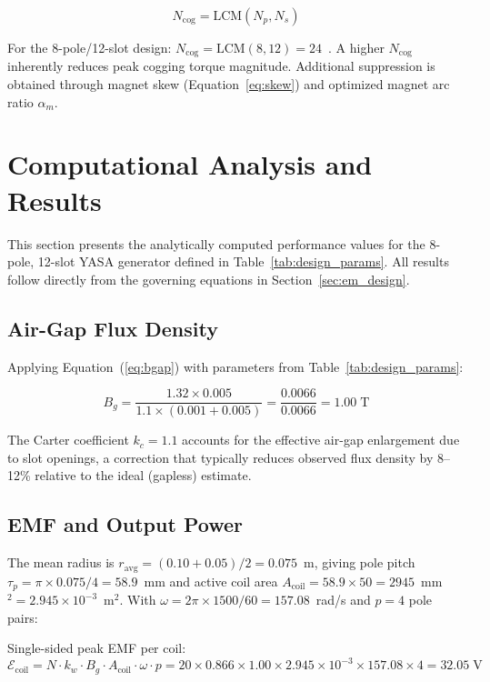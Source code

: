 \documentclass[12pt,a4paper]{article}
\begin{document}
\begin{equation}
N_{\text{cog}} = \text{LCM}(N_p, N_s)
\end{equation}

For the 8-pole/12-slot design: $N_{\text{cog}} = \text{LCM}(8,12) = 24$~\cite{ref30,ref31}. A higher $N_{\text{cog}}$ inherently reduces peak cogging torque magnitude. Additional suppression is obtained through magnet skew (Equation~\ref{eq:skew}) and optimized magnet arc ratio $\alpha_m$.

\section{Computational Analysis and Results}
\label{sec:results}

This section presents the analytically computed performance values for the 8-pole, 12-slot YASA generator defined in Table~\ref{tab:design_params}. All results follow directly from the governing equations in Section~\ref{sec:em_design}.

\subsection{Air-Gap Flux Density}
Applying Equation~(\ref{eq:bgap}) with parameters from Table~\ref{tab:design_params}:

\begin{equation}
B_g = \frac{1.32 \times 0.005}{1.1 \times (0.001 + 0.005)} = \frac{0.0066}{0.0066} = 1.00 \; \text{T}
\end{equation}

The Carter coefficient $k_c = 1.1$ accounts for the effective air-gap enlargement due to slot openings, a correction that typically reduces observed flux density by 8--12\% relative to the ideal (gapless) estimate.

\subsection{EMF and Output Power}

The mean radius is $r_{\text{avg}} = (0.10 + 0.05)/2 = 0.075$~m, giving pole pitch $\tau_p = \pi \times 0.075 / 4 = 58.9$~mm and active coil area $A_{\text{coil}} = 58.9 \times 50 = 2945$~mm$^2 = 2.945 \times 10^{-3}$~m$^2$. With $\omega = 2\pi \times 1500/60 = 157.08$~rad/s and $p = 4$ pole pairs:

Single-sided peak EMF per coil:
\begin{equation}
\mathcal{E}_{\text{coil}} = N \cdot k_w \cdot B_g \cdot A_{\text{coil}} \cdot \omega \cdot p = 20 \times 0.866 \times 1.00 \times 2.945\times10^{-3} \times 157.08 \times 4 = 32.05 \; \text{V}
\end{equation}
\end{document}
